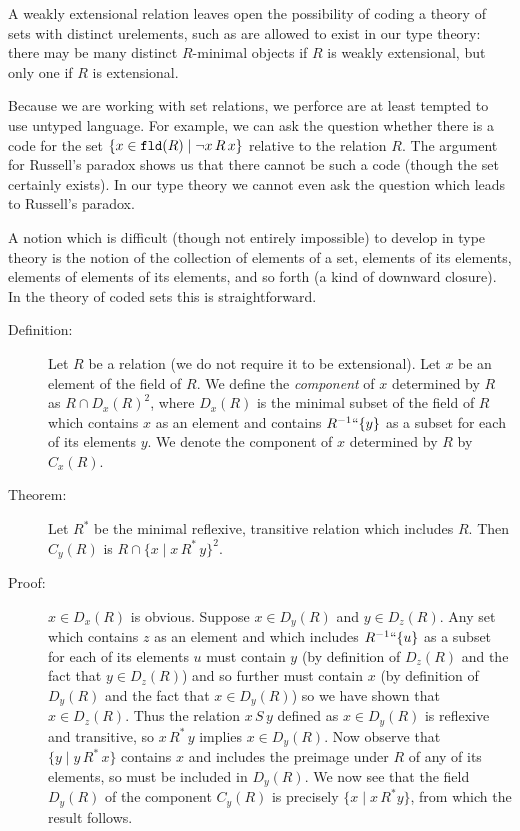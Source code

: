 \documentclass[12pt]{book}
\begin{document}
A weakly extensional relation leaves open the possibility of coding a
theory of sets with distinct urelements, such as are allowed to exist
in our type theory: there may be many distinct $R$-minimal objects if
$R$ is weakly extensional, but only one if $R$ is extensional.

Because we are working with set relations, we perforce are at least
tempted to use untyped language.  For example, we can ask the question
whether there is a code for the set $\{x \in {\tt fld}(R) \mid \neg x
\,R\, x\}$ relative to the relation $R$.  The argument for Russell's
paradox shows us that there cannot be such a code (though the set
certainly exists).  In our type theory we cannot even ask the question
which leads to Russell's paradox.

A notion which is difficult (though not entirely impossible) to
develop in type theory is the notion of the collection of elements of
a set, elements of its elements, elements of elements of its elements,
and so forth (a kind of downward closure).  In the theory of coded sets
this is straightforward.

\begin{description}

\item[Definition:] Let $R$ be a relation (we do not require it to be
extensional).  Let $x$ be an element of the field of $R$.  We define
the {\em component\/} of $x$ determined by $R$ as $R \cap D_x(R)^2$,
where $D_x(R)$ is the minimal subset of the field of $R$ which
contains $x$ as an element and contains $R^{-1}``\{y\}$ as a subset
for each of its elements $y$.  We denote the component of $x$
determined by $R$ by $C_x(R)$.

\item[Theorem:] Let $R^*$ be the minimal reflexive, transitive
relation which includes $R$.  Then $C_y(R)$ is $R \cap \{x \mid x
\,R^*\,y\}^2$.

\item[Proof:] $x \in D_x(R)$ is obvious.  Suppose $x \in D_y(R)$ and
$y \in D_z(R)$.  Any set which contains $z$ as an element and which
includes $R^{-1}``\{u\}$ as a subset for each of its elements $u$ must
contain $y$ (by definition of $D_z(R)$ and the fact that $y \in
D_z(R)$) and so further must contain $x$ (by definition of $D_y(R)$
and the fact that $x \in D_y(R)$) so we have shown that $x \in
D_z(R)$.  Thus the relation $x \,S\,y$ defined as $x \in D_y(R)$ is
reflexive and transitive, so $x \,R^*\, y$ implies $x \in D_y(R)$.
Now observe that $\{y \mid y\,R^*\,x\}$ contains $x$ and includes the
preimage under $R$ of any of its elements, so must be included in
$D_y(R)$.  We now see that the field $D_y(R)$ of the component
$C_y(R)$ is precisely $\{x \mid x \,R^* y\}$, from which the result
follows.

\end{description}
\end{document}

